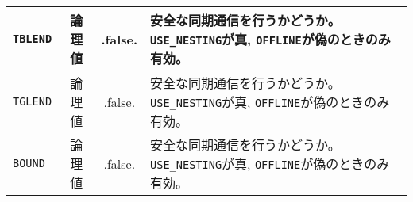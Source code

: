 \begin{tabularx}{150mm}{|l|c|c|X|}
 \verb|TBLEND| & 論理値 & .false. & 安全な同期通信を行うかどうか。\verb|USE_NESTING|が真, \verb|OFFLINE|が偽のときのみ有効。 \\ \hline
 \verb|TGLEND| & 論理値 & .false. & 安全な同期通信を行うかどうか。\verb|USE_NESTING|が真, \verb|OFFLINE|が偽のときのみ有効。 \\ \hline
 \verb|BOUND| & 論理値 & .false. & 安全な同期通信を行うかどうか。\verb|USE_NESTING|が真, \verb|OFFLINE|が偽のときのみ有効。 \\ \hline
\end{tabularx}



